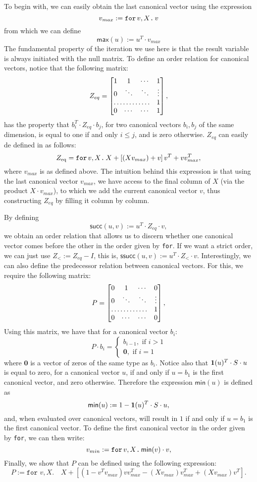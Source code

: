 To begin with, we can easily obtain the last canonical vector using the expression $$v_{max} := \texttt{for}\, v,X \texttt{.}\, v$$ from which we can define $$\mathsf{max}(u):=u^T\cdot v_{max}$$
The fundamental property of the iteration we use here is that the result variable is always initiated with the null matrix.
To define an order relation for canonical vectors, notice that the following matrix:
\[
Z_{eq} = \begin{bmatrix}
    1 & 1 & \cdots &  1 \\
    0 & \ddots & \ddots & \vdots \\
    \hdotsfor{3} & 1 \\
    0 & \cdots & \cdots & 1
\end{bmatrix},
\]
has the property that $b_i^T\cdot Z_{eq} \cdot b_j$, for two canonical vectors $b_i,b_j$ of the same dimension, is equal to one if and only $i\leq j$, and is zero otherwise. $Z_{eq}$ can easily de defined in \langfor as follows:
$$Z_{\text{eq}}=\texttt{for}\, v,X \texttt{.}\, X + \left[ (Xv_{max}) + v \right]v^T + vv^T_{max},$$
where $v_{max}$ is as defined above. The intuition behind this expression is that using the last canonical vector $v_{max}$, we have access to the final column of $X$ (via the product $X\cdot v_{max}$), to which we add the current canonical vector $v$, thus constructing $Z_{eq}$ by filling it column by column.

By defining $$\mathsf{succ}(u,v) := u^T\cdot Z_{eq} \cdot v,$$
we obtain an order relation that allows us to discern whether one canonical vector comes before the other in the order given by \texttt{for}. If we want a strict order, we can just use $Z_< := Z_{eq} - I$, this is, $\mathsf{ssucc}(u,v) := u^T\cdot Z_{<} \cdot v$.
Interestingly, we can also define the predecessor relation between canonical vectors. For this, we require the following matrix:
\[
P = \begin{bmatrix}
    0 & 1 & \cdots &  0 \\
    0 & \ddots & \ddots & \vdots \\
    \hdotsfor{3} & 1 \\
    0 & \cdots & \cdots & 0
\end{bmatrix},
\]
Using this matrix, we have that for a canonical vector $b_i$:
\[
P\cdot b_i=\begin{cases}
               b_{i-1}, \text{ if } i > 1 \\
              \mathbf{0}, \text{ if } i = 1
            \end{cases}
\]
where $\mathbf{0}$ is a vector of zeros of the same type as $b_i$. Notice also that $\mathbf{1}(u)^T\cdot S \cdot u$ is equal to zero, for a canonical vector $u$, if and only if $u = b_1$ is the first canonical vector, and zero otherwise.
Therefore the expression $\mathsf{min}(u)$ is defined as $$\mathsf{min}(u) := 1 - \mathbf{1}(u)^T\cdot S \cdot u,$$ and, when evaluated over canonical vectors, will result in $1$ if and only if $u=b_1$ is the first canonical vector.
To define the first canonical vector in the order given by \texttt{for}, we can then write:
$$v_{min} := \texttt{for}\, v,X \texttt{.}\, \mathsf{min}(v)\cdot v,$$
Finally, we show that $P$ can be defined using the following \langfor expression:
$$P:= \texttt{for }v,X.\quad X + \left[ (1 - v^Tv_{max})vv_{max}^T - (Xv_{max}) v_{max}^T + (Xv_{max})v^T\right].$$
